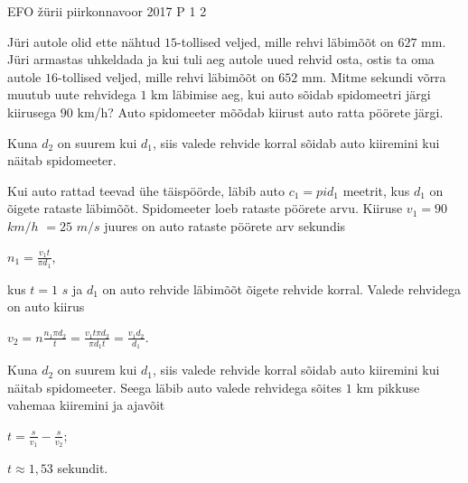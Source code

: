 {EFO žürii} %
{piirkonnavoor} %
{2017} %
{P 1} %
{2} %
{

\ifStatement
Jüri autole olid ette nähtud $15$-tollised veljed, mille rehvi läbimõõt on $627$ mm. Jüri armastas uhkeldada ja kui tuli aeg autole uued rehvid osta, ostis ta oma autole $16$-tollised veljed, mille rehvi läbimõõt on $652$ mm. Mitme sekundi võrra muutub uute rehvidega $1$ km läbimise aeg, kui auto sõidab spidomeetri järgi kiirusega $90$ km/h? Auto spidomeeter mõõdab kiirust auto ratta pöörete järgi. 
\fi


\ifHint
Kuna $d_2$ on suurem kui $d_1$, siis valede rehvide korral sõidab auto kiiremini kui näitab spidomeeter.
\fi

\ifSolution
Kui auto rattad teevad ühe täispöörde, läbib auto $c_1 = pi d_1$ meetrit, kus $d_1$ on õigete rataste läbimõõt. 
\newline
Spidomeeter loeb rataste pöörete arvu. Kiiruse $v_1 = 90$ $km/h$ $= 25$ $m/s$ juures on auto rataste pöörete arv sekundis
\begin{center}
$n_1 =\frac{v_1 t}{\pi d_1}$,
\end{center}
kus $t = 1$ $s$ ja $d_1$ on auto rehvide läbimõõt õigete rehvide korral. Valede rehvidega on auto kiirus
\begin{center}
$v_2 = n\frac{n_1\pi d_2}{t} = \frac{v_1 t \pi d_2}{\pi d_1 t} = \frac{v_1 d_2}{d_1}$.
\end{center}
Kuna $d_2$ on suurem kui $d_1$, siis valede rehvide korral sõidab auto kiiremini kui näitab spidomeeter. Seega läbib auto valede rehvidega sõites $1$ km pikkuse vahemaa kiiremini ja ajavõit
\begin{center}
$t = \frac{s}{v_1} - \frac{s}{v_2}$;
\end{center}
\begin{center}
$t \approx 1,53$ sekundit.
\end{center}
\fi
}